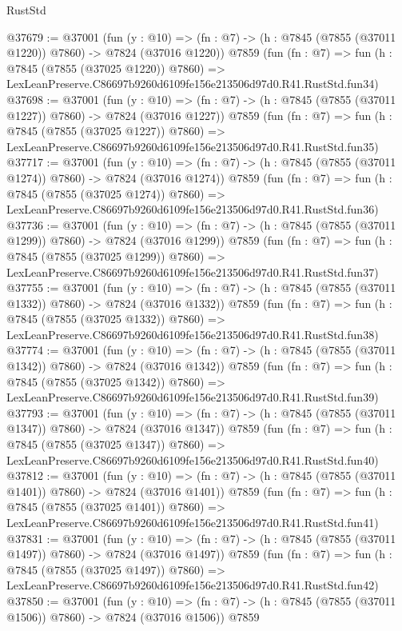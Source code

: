 \begin{lexlean}{RustStd}
\begin{coremodule}
@37679 := @37001
    (fun (y : @10) => (fn : @7) -> (h : @7845 (@7855 (@37011 @1220)) @7860) -> @7824 (@37016 @1220))
    @7859
    (fun (fn : @7) =>
    fun (h : @7845 (@7855 (@37025 @1220)) @7860) =>
    LexLeanPreserve.C86697b9260d6109fe156e213506d97d0.R41.RustStd.fun34)
@37698 := @37001
    (fun (y : @10) => (fn : @7) -> (h : @7845 (@7855 (@37011 @1227)) @7860) -> @7824 (@37016 @1227))
    @7859
    (fun (fn : @7) =>
    fun (h : @7845 (@7855 (@37025 @1227)) @7860) =>
    LexLeanPreserve.C86697b9260d6109fe156e213506d97d0.R41.RustStd.fun35)
@37717 := @37001
    (fun (y : @10) => (fn : @7) -> (h : @7845 (@7855 (@37011 @1274)) @7860) -> @7824 (@37016 @1274))
    @7859
    (fun (fn : @7) =>
    fun (h : @7845 (@7855 (@37025 @1274)) @7860) =>
    LexLeanPreserve.C86697b9260d6109fe156e213506d97d0.R41.RustStd.fun36)
@37736 := @37001
    (fun (y : @10) => (fn : @7) -> (h : @7845 (@7855 (@37011 @1299)) @7860) -> @7824 (@37016 @1299))
    @7859
    (fun (fn : @7) =>
    fun (h : @7845 (@7855 (@37025 @1299)) @7860) =>
    LexLeanPreserve.C86697b9260d6109fe156e213506d97d0.R41.RustStd.fun37)
@37755 := @37001
    (fun (y : @10) => (fn : @7) -> (h : @7845 (@7855 (@37011 @1332)) @7860) -> @7824 (@37016 @1332))
    @7859
    (fun (fn : @7) =>
    fun (h : @7845 (@7855 (@37025 @1332)) @7860) =>
    LexLeanPreserve.C86697b9260d6109fe156e213506d97d0.R41.RustStd.fun38)
@37774 := @37001
    (fun (y : @10) => (fn : @7) -> (h : @7845 (@7855 (@37011 @1342)) @7860) -> @7824 (@37016 @1342))
    @7859
    (fun (fn : @7) =>
    fun (h : @7845 (@7855 (@37025 @1342)) @7860) =>
    LexLeanPreserve.C86697b9260d6109fe156e213506d97d0.R41.RustStd.fun39)
@37793 := @37001
    (fun (y : @10) => (fn : @7) -> (h : @7845 (@7855 (@37011 @1347)) @7860) -> @7824 (@37016 @1347))
    @7859
    (fun (fn : @7) =>
    fun (h : @7845 (@7855 (@37025 @1347)) @7860) =>
    LexLeanPreserve.C86697b9260d6109fe156e213506d97d0.R41.RustStd.fun40)
@37812 := @37001
    (fun (y : @10) => (fn : @7) -> (h : @7845 (@7855 (@37011 @1401)) @7860) -> @7824 (@37016 @1401))
    @7859
    (fun (fn : @7) =>
    fun (h : @7845 (@7855 (@37025 @1401)) @7860) =>
    LexLeanPreserve.C86697b9260d6109fe156e213506d97d0.R41.RustStd.fun41)
@37831 := @37001
    (fun (y : @10) => (fn : @7) -> (h : @7845 (@7855 (@37011 @1497)) @7860) -> @7824 (@37016 @1497))
    @7859
    (fun (fn : @7) =>
    fun (h : @7845 (@7855 (@37025 @1497)) @7860) =>
    LexLeanPreserve.C86697b9260d6109fe156e213506d97d0.R41.RustStd.fun42)
@37850 := @37001
    (fun (y : @10) => (fn : @7) -> (h : @7845 (@7855 (@37011 @1506)) @7860) -> @7824 (@37016 @1506))
    @7859

\end{coremodule}
\end{lexlean}
